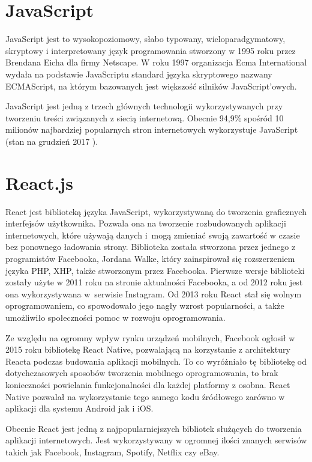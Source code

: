 \section{JavaScript}
JavaScript jest to wysokopoziomowy, słabo typowany, wieloparadgymatowy, skryptowy i interpretowany język programowania stworzony w 1995 roku przez Brendana Eicha dla firmy Netscape.  W roku 1997 organizacja Ecma International wydała na podstawie JavaScriptu standard języka skryptowego nazwany ECMAScript, na którym bazowanych jest większość silników JavaScript'owych.

JavaScript jest jedną z trzech głównych technologii wykorzystywanych przy tworzeniu treści związanych z siecią internetową. Obecnie 94,9\% spośród 10 milionów najbardziej popularnych stron internetowych wykorzystuje JavaScript (stan na grudzień 2017 \cite{JSUsage}).

\section{React.js}
React jest biblioteką języka JavaScript, wykorzystywaną do tworzenia graficznych interfejsów użytkownika. Pozwala ona na tworzenie rozbudowanych aplikacji internetowych, które używają danych i~mogą zmieniać swoją zawartość w czasie bez ponownego ładowania strony. Biblioteka została stworzona przez jednego z programistów Facebooka, Jordana Walke, który zainspirował się rozszerzeniem języka PHP, XHP, także stworzonym przez Facebooka. Pierwsze wersje biblioteki zostały użyte w 2011 roku na stronie aktualności Facebooka, a od 2012 roku jest ona wykorzystywana w~serwisie Instagram. Od 2013 roku React stał się wolnym oprogramowaniem, co spowodowało jego nagły wzrost popularności, a także umożliwiło społeczności  pomoc w rozwoju oprogramowania.

Ze względu na ogromny wpływ rynku urządzeń mobilnych, Facebook ogłosił w 2015 roku bibliotekę React Native, pozwalającą na korzystanie z architektury Reacta podczas budowania aplikacji mobilnych. To co wyróżniało tę bibliotekę od dotychczasowych sposobów tworzenia mobilnego oprogramowania, to brak konieczności powielania funkcjonalności dla każdej platformy z osobna. React Native pozwalał na wykorzystanie tego samego kodu źródłowego zarówno w aplikacji dla systemu Android jak i iOS.

Obecnie React jest jedną z najpopularniejszych bibliotek służących do tworzenia aplikacji internetowych. Jest wykorzystywany w ogromnej ilości znanych serwisów takich jak Facebook, Instagram, Spotify, Netflix czy eBay. 
